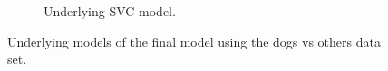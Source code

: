 \begin{figure}[ht]
\begin{subfigure}{.45\textwidth}
        \captionsetup{width=0.8\linewidth}
        \captionsetup{justification=centering}
        \caption{Underlying SVC model.}
    \end{subfigure}
    \captionsetup{width=0.9\linewidth}
    \captionsetup{justification=centering}
    \caption{Underlying models of the final model using the dogs vs others data set.}
\end{figure}


